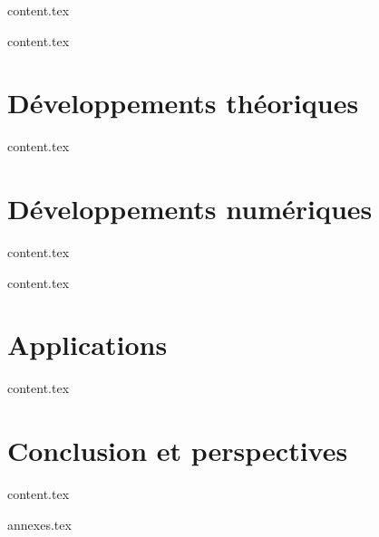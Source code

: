 \documentclass{bredele}
\begin{document}
\clearemptydoublepage
{content.tex}

\clearemptydoublepage
{content.tex}

\part{Développements théoriques}

\clearemptydoublepage
{content.tex}

\part{Développements numériques}

\clearemptydoublepage
{content.tex}


\clearemptydoublepage
{content.tex}

\part{Applications}

\clearemptydoublepage
{content.tex}


\part{Conclusion et perspectives}


\clearemptydoublepage
{content.tex}



\clearemptydoublepage
\renewcommand{\thesubsection}{\Alph{chapter}}
{annexes.tex}


\clearemptydoublepage
\backmatter
\printbibliography

\tikzexternaldisable
\end{document}
